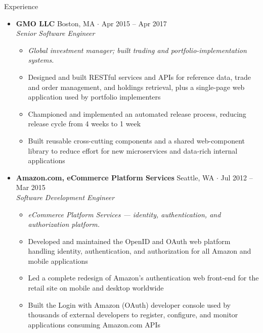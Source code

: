 \documentclass[10pt,oneside]{article}
\newenvironment{ressection}[1]{
  \vspace{4pt}
  {\fontfamily{phv}\selectfont\Large#1}
  \begin{itemize}
    \vspace{3pt}
}{
  \end{itemize}
}
\newcommand{\ressubitem}[1]{
  \vspace{-1pt}
\item \begin{flushleft} #1 \end{flushleft}
}
\newcommand{\rescontext}[1]{
  \vspace{-3pt}
\item[] \begin{flushleft} \textit{\small #1} \end{flushleft}
}
\newcommand{\resbigitem}[3]{
  \vspace{-5pt}
\item
  \textbf{#1} \hfill #2 \\
  \textit{#3}
}
\newenvironment{ressubsec}[3]{
  \resbigitem{#1}{#2}{#3}
  \vspace{-2pt}
  \begin{itemize}
}{
  \end{itemize}
}
\begin{document}
\begin{ressection}{Experience}
  \begin{ressubsec}{GMO LLC}{Boston, MA \; $\cdot$ \; Apr 2015 -- Apr 2017}{Senior Software Engineer}
    \rescontext{Global investment manager; built trading and portfolio-implementation systems.}
    \ressubitem{Designed and built RESTful services and APIs for reference data, trade and order management, and holdings retrieval, plus a single-page web application used by portfolio implementers}
    \ressubitem{Championed and implemented an automated release process, reducing release cycle from 4 weeks to 1 week}
    \ressubitem{Built reusable cross-cutting components and a shared web-component library to reduce effort for new microservices and data-rich internal applications}
  \end{ressubsec}

  \begin{ressubsec}{Amazon.com, eCommerce Platform Services}{Seattle, WA \; $\cdot$ \; Jul 2012 -- Mar 2015}{Software Development Engineer}
    \rescontext{eCommerce Platform Services --- identity, authentication, and authorization platform.}
    \ressubitem{Developed and maintained the OpenID and OAuth web platform handling identity, authentication, and authorization for all Amazon and mobile applications}
    \ressubitem{Led a complete redesign of Amazon's authentication web front-end for the retail site on mobile and desktop worldwide}
    \ressubitem{Built the Login with Amazon (OAuth) developer console used by thousands of external developers to register, configure, and monitor applications consuming Amazon.com APIs}
  \end{ressubsec}

\end{ressection}
\end{document}
